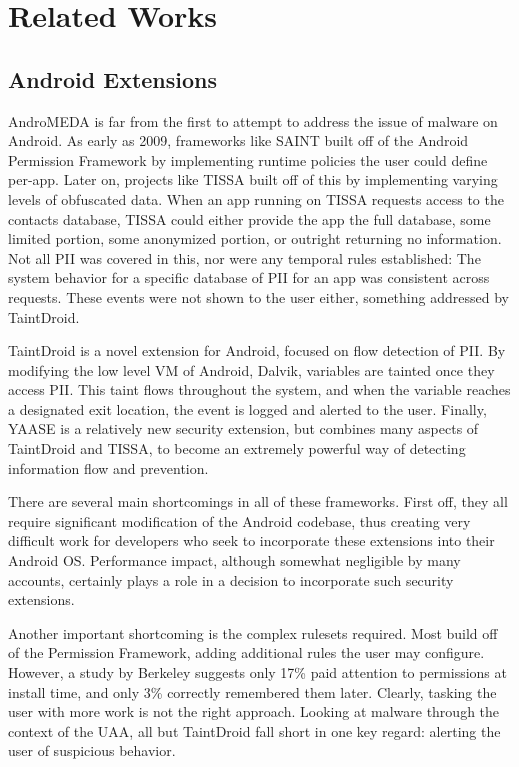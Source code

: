 \chapter{Related Works}
\label{sec:relatedworks}


\section{Android Extensions}
AndroMEDA is far from the first to attempt to address the issue of malware on Android. As early as 2009, frameworks like SAINT\citep{ongtang2012semantically} built off of the Android Permission Framework by implementing runtime policies the user could define per-app. Later on, projects like TISSA\citep{zhou2011taming} built off of this by implementing varying levels of obfuscated data. When an app running on TISSA requests access to the contacts database, TISSA could either provide the app the full database, some limited portion, some anonymized portion, or outright returning no information. Not all PII was covered in this, nor were any temporal rules established: The system behavior for a specific database of PII for an app was consistent across requests. These events were not shown to the user either, something addressed by TaintDroid\citep{enck2010taintdroid}.

TaintDroid is a novel extension for Android, focused on flow detection of PII. By modifying the low level VM of Android, Dalvik, variables are tainted once they access PII. This taint flows throughout the system, and when the variable reaches a designated exit location, the event is logged and alerted to the user. Finally, YAASE\citep{russello2011yaase} is a relatively new security extension, but combines many aspects of TaintDroid and TISSA, to become an extremely powerful way of detecting information flow and prevention.

There are several main shortcomings in all of these frameworks. First off, they all require significant modification of the Android codebase, thus creating very difficult work for developers who seek to incorporate these extensions into their Android OS. Performance impact, although somewhat negligible by many accounts, certainly plays a role in a decision to incorporate such security extensions.

Another important shortcoming is the complex rulesets required. Most build off of the Permission Framework, adding additional rules the user may configure. However, a study by Berkeley suggests only 17\% paid attention to permissions at install time, and only 3\% correctly remembered them later\citep{felt2012android}. Clearly, tasking the user with more work is not the right approach. Looking at malware through the context of the UAA, all but TaintDroid fall short in one key regard: alerting the user of suspicious behavior.

